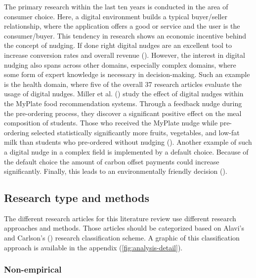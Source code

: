 The primary research within the last ten years is conducted in the area of consumer choice. Here, a digital environment builds a typical buyer/seller relationship, where the application offers a good or service and the user is the consumer/buyer. This tendency in research shows an economic incentive behind the concept of nudging. If done right digital nudges are an excellent tool to increase conversion rates and overall revenue (\cite{mirsch_making_2018}).
However, the interest in digital nudging also spans across other domains, especially complex domains, where some form of expert knowledge is necessary in decision-making. Such an example is the health domain, where five of the overall 37 research articles evaluate the usage of digital nudges. Miller et al. (\citeyear{miller_effects_2016}) study the effect of digital nudges within the MyPlate food recommendation systems. Through a feedback nudge during the pre-ordering process, they discover a significant positive effect on the meal composition of students. Those who received the MyPlate nudge while pre-ordering selected statistically significantly more fruits, vegetables, and low-fat milk than students who pre-ordered without nudging (\cite{miller_effects_2016}).
Another example of such a digital nudge in a complex field is implemented by a default choice. Because of the default choice the amount of carbon offset payments could increase significantly. Finally, this leads to an environmentally friendly decision (\cite{szekely_nudging_2016}).


\subsection{Research type and methods}
The different research articles for this literature review use different research approaches and methods. Those articles should be categorized based on Alavi's and Carlson's (\citeyear{alavi_review_1992}) research classification scheme. A graphic of this classification approach is available in the appendix (\ref{fig:analysis-detail}).

\subsubsection{Non-empirical}

